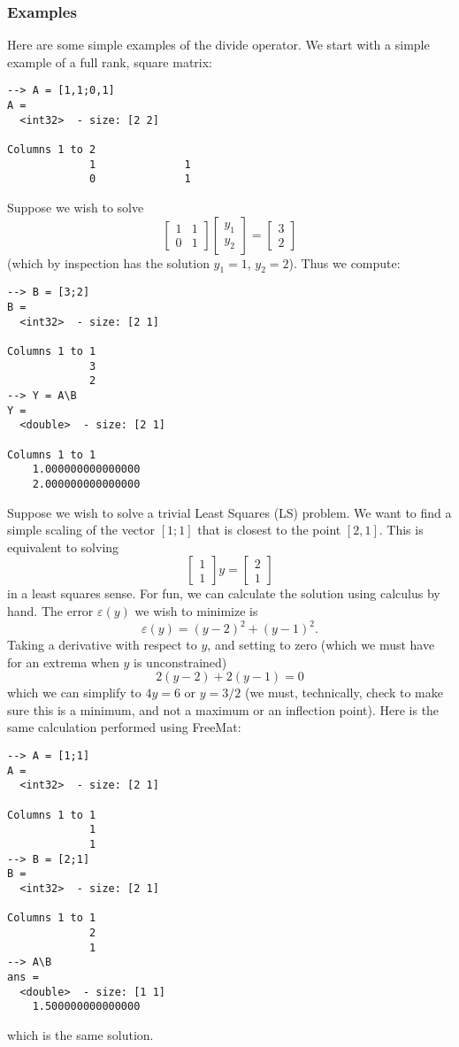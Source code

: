 \subsubsection{Examples}
Here are some simple examples of the divide operator.  We start with a simple example of a full rank, square matrix:
\begin{verbatim}
--> A = [1,1;0,1]
A =
  <int32>  - size: [2 2]
  
Columns 1 to 2
             1              1
             0              1
\end{verbatim}
Suppose we wish to solve
\[
  \begin{bmatrix} 1 & 1 \\ 0 & 1 \end{bmatrix}
  \begin{bmatrix} y_1 \\ y_2 \end{bmatrix}
 = 
  \begin{bmatrix} 3 \\ 2 \end{bmatrix}
\]
(which by inspection has the solution $y_1 = 1$, $y_2 = 2$).  Thus we compute:
\begin{verbatim}
--> B = [3;2]
B =
  <int32>  - size: [2 1]
  
Columns 1 to 1
             3
             2
--> Y = A\B
Y =
  <double>  - size: [2 1]
  
Columns 1 to 1
    1.000000000000000
    2.000000000000000
\end{verbatim}

Suppose we wish to solve a trivial Least Squares (LS) problem.  We want to find a simple scaling of the vector $[1;1]$ that is closest to the point $[2,1]$.  This is equivalent to solving
\[
\begin{bmatrix} 1 \\ 1 \end{bmatrix} y = \begin{bmatrix} 2 \\ 1 \end{bmatrix}
\]
in a least squares sense.  For fun, we can calculate the solution using calculus by hand.  The error $\varepsilon(y)$ we wish to minimize is
\[
  \varepsilon(y) = (y - 2)^2 + (y-1)^2.
\]
Taking a derivative with respect to $y$, and setting to zero (which we must have for an extrema when $y$ is unconstrained)
\[
  2 (y-2) + 2 (y-1) = 0
\]
which we can simplify to $4y = 6$ or $y = 3/2$ (we must, technically, check to make sure this is a minimum, and not a maximum or an inflection point).  Here is the same calculation performed using FreeMat:
\begin{verbatim}
--> A = [1;1]
A =
  <int32>  - size: [2 1]
  
Columns 1 to 1
             1
             1
--> B = [2;1]
B =
  <int32>  - size: [2 1]
  
Columns 1 to 1
             2
             1
--> A\B
ans =
  <double>  - size: [1 1]
    1.500000000000000
\end{verbatim}
which is the same solution.
